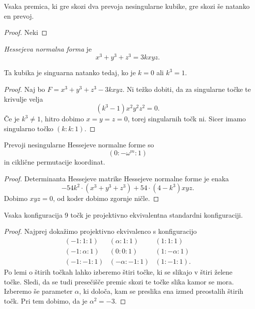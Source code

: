 \begin{izrek}
Vsaka premica, ki gre skozi dva prevoja nesingularne kubike, gre
skozi še natanko en prevoj.
\end{izrek}

\begin{proof}
Neki
\end{proof}


\begin{definicija}
\emph{Hessejeva normalna forma}
je
\[
x^3 + y^3 + z^3 = 3kxyz.
\]
\end{definicija}

\begin{trditev}
Ta kubika je singuarna natanko tedaj, ko je $k = 0$ ali $k^3 = 1$.
\end{trditev}

\begin{proof}
Naj bo $F = x^3 + y^3 + z^3 - 3kxyz$. Ni težko dobiti, da za
singularne točke te krivulje velja
\[
(k^3 - 1) x^2 y^2 z^2 = 0.
\]
Če je $k^3 \ne 1$, hitro dobimo $x=y=z=0$, torej singularnih točk
ni. Sicer imamo singularno točko $(k : k : 1)$.
\end{proof}

\begin{trditev}
Prevoji nesingularne Hessejeve normalne forme so
\[
(0 : -\omega^m : 1)
\]
in ciklične permutacije koordinat.
\end{trditev}

\begin{proof}
Determinanta Hessejeve matrike Hessejeve normalne forme je enaka
\[
-54k^2 \cdot (x^3 + y^3 + z^3) + 54 \cdot (4 - k^3)xyz.
\]
Dobimo $xyz = 0$, od koder dobimo zgornje ničle.
\end{proof}

\begin{izrek}
Vsaka konfiguracija 9 točk je projektivno ekvivalentna standardni
konfiguraciji.
\end{izrek}

\begin{proof}
Najprej dokažimo projektivno ekvivalenco s konfiguracijo
\[
\begin{array}{ccc}
(-1 :    1   : 1) & ( \alpha :  1 : 1) & (1 :     1   : 1) \\
(-1 : \alpha : 1) & (    0   :  0 : 1) & (1 : -\alpha : 1) \\
(-1 :   -1   : 1) & (-\alpha : -1 : 1) & (1 :    -1   : 1).
\end{array}
\]
Po lemi o štirih točkah lahko izberemo štiri točke, ki se slikajo
v štiri želene točke. Sledi, da se tudi presečišče premic skozi te
točke slika kamor se mora. Izberemo še parameter $\alpha$, ki
določa, kam se preslika ena izmed preostalih štirih točk. Pri tem
dobimo, da je $\alpha^2 = -3$.
\end{proof}

